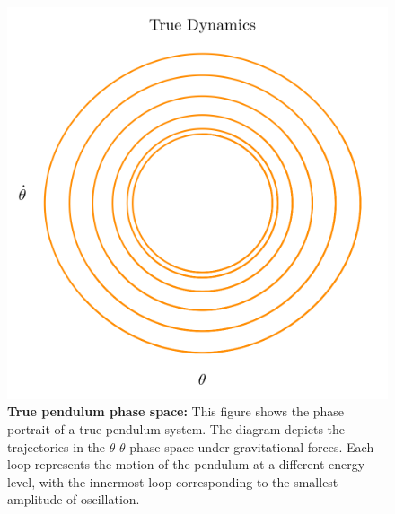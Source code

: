 \begin{figure}[t]
\centering
\begin{minipage}[b]{.45\textwidth}
\centering
   \includegraphics[width=\textwidth]{project_2/images/z_zdot_true.png}
   \vspace{-3mm}
    \caption{\textbf{True pendulum phase space:} This figure shows the phase portrait of a true pendulum system. The diagram depicts the trajectories in the $\theta$-$\dot{\theta}$ phase space under gravitational forces. Each loop represents the motion of the pendulum at a different energy level, with the innermost loop corresponding to the smallest amplitude of oscillation.}
    \label{fig:true_z_zdot_pendulum}
\end{minipage}\qquad\quad
\begin{minipage}[b]{.45\textwidth}
\centering

\end{minipage}
\end{figure}
